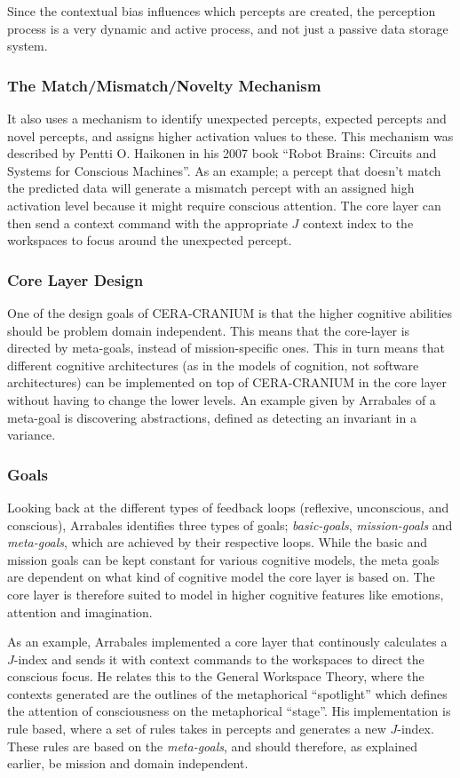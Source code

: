 Since the contextual bias influences which percepts are created, the perception
process is a very dynamic and active process, and not just a passive data
storage system.

\subsubsection{The Match/Mismatch/Novelty Mechanism}
It also uses a mechanism to identify unexpected percepts, expected percepts and
novel percepts, and assigns higher activation values to these. This mechanism
was described by Pentti O. Haikonen in his 2007 book ``Robot Brains: Circuits
and Systems for Conscious Machines''\cite{haikonen2007robotbrains}. As an
example; a percept that doesn't match the predicted data will generate a
mismatch percept with an assigned high activation level because it might
require conscious attention. The core layer can then send a context command
with the appropriate $J$ context index to the workspaces to focus around the
unexpected percept.

\subsubsection{Core Layer Design}
One of the design goals of CERA-CRANIUM is that the higher cognitive abilities
should be problem domain independent.\cite{arrabales2009ceracranium} This means
that the core-layer is directed by meta-goals, instead of mission-specific ones.
This in turn means that different cognitive architectures (as in the models of
cognition, not software architectures) can be implemented on top of CERA-CRANIUM
in the core layer without having to change the lower levels. An example given by
Arrabales of a meta-goal is discovering abstractions, defined as detecting an
invariant in a variance.

\subsubsection{Goals}
Looking back at the different types of feedback loops (reflexive, unconscious,
and conscious), Arrabales identifies three types of goals;
\textit{basic-goals}, \textit{mission-goals} and \textit{meta-goals}, which are
achieved by their respective loops. While the basic and mission goals can be
kept constant for various cognitive models, the meta goals are dependent
on what kind of cognitive model the core layer is based on. The core
layer is therefore suited to model in higher cognitive features like emotions,
attention and imagination.

As an example, Arrabales implemented a core layer that continously calculates a
$J$-index and sends it with context commands to the workspaces to direct the
conscious focus. He relates this to the General Workspace Theory, where the
contexts generated are the outlines of the metaphorical ``spotlight'' which
defines the attention of consciousness on the metaphorical
``stage''.\cite{baars2005gwt} His implementation is rule based, where a set of
rules takes in percepts and generates a new $J$-index. These rules are based on
the \textit{meta-goals}, and should therefore, as explained earlier, be mission
and domain independent.